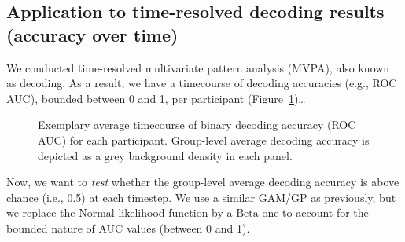 \documentclass[
  doc,
  floatsintext,
  longtable,
  a4paper,
  nolmodern,
  notxfonts,
  notimes,
  colorlinks=true,linkcolor=blue,citecolor=blue,urlcolor=blue]{apa7}
\begin{document}
\subsection{Application to time-resolved decoding results (accuracy over
time)}\label{application-to-time-resolved-decoding-results-accuracy-over-time}

We conducted time-resolved multivariate pattern analysis (MVPA), also
known as decoding. As a result, we have a timecourse of decoding
accuracies (e.g., ROC AUC), bounded between 0 and 1, per participant
(Figure~\ref{fig-mne-decoding})\ldots{}

\begin{figure}[!htb]

\caption{\label{fig-mne-decoding}Exemplary average timecourse of binary
decoding accuracy (ROC AUC) for each participant. Group-level average
decoding accuracy is depicted as a grey background density in each
panel.}


\end{figure}%

Now, we want to \emph{test} whether the group-level average decoding
accuracy is above chance (i.e., 0.5) at each timestep. We use a similar
GAM/GP as previously, but we replace the \(\mathrm{Normal}\) likelihood
function by a \(\mathrm{Beta}\) one to account for the bounded nature of
AUC values (between 0 and 1).
\end{document}

